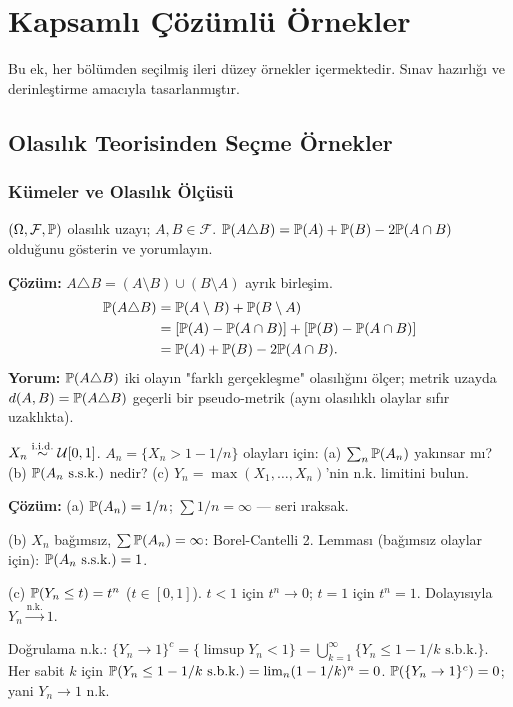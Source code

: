 \chapter{Kapsamlı Çözümlü Örnekler}
\label{app:kapsamli_ornekler}

Bu ek, her bölümden seçilmiş ileri düzey örnekler içermektedir. Sınav hazırlığı ve derinleştirme amacıyla tasarlanmıştır.

\section{Olasılık Teorisinden Seçme Örnekler}
\label{app:olasilik_ornekler}

\subsection{Kümeler ve Olasılık Ölçüsü}

\begin{ornek}
$(\Omega,\mathcal{F},\mathbb{P})$ olasılık uzayı; $A,B\in\mathcal{F}$.
$\mathbb{P}(A\triangle B) = \mathbb{P}(A)+\mathbb{P}(B)-2\mathbb{P}(A\cap B)$ olduğunu gösterin ve yorumlayın.

\textbf{Çözüm:} $A\triangle B = (A\setminus B)\cup(B\setminus A)$ ayrık birleşim.
\begin{align*}
  \mathbb{P}(A\triangle B) &= \mathbb{P}(A\setminus B)+\mathbb{P}(B\setminus A) \\
  &= [\mathbb{P}(A)-\mathbb{P}(A\cap B)]+[\mathbb{P}(B)-\mathbb{P}(A\cap B)] \\
  &= \mathbb{P}(A)+\mathbb{P}(B)-2\mathbb{P}(A\cap B).
\end{align*}
\textbf{Yorum:} $\mathbb{P}(A\triangle B)$ iki olayın "farklı gerçekleşme" olasılığını ölçer; metrik uzayda $d(A,B)=\mathbb{P}(A\triangle B)$ geçerli bir pseudo-metrik (aynı olasılıklı olaylar sıfır uzaklıkta).
\end{ornek}

\begin{ornek}
$X_n\overset{\text{i.i.d.}}{\sim}\mathcal{U}[0,1]$. $A_n=\{X_n>1-1/n\}$ olayları için:
(a) $\sum_n\mathbb{P}(A_n)$ yakınsar mı?
(b) $\mathbb{P}(A_n\text{ s.s.k.})$ nedir?
(c) $Y_n=\max(X_1,\ldots,X_n)$'nin n.k. limitini bulun.

\textbf{Çözüm:}
(a) $\mathbb{P}(A_n)=1/n$; $\sum 1/n=\infty$ --- seri ıraksak.

(b) $X_n$ bağımsız, $\sum\mathbb{P}(A_n)=\infty$: Borel-Cantelli 2. Lemması (bağımsız olaylar için): $\mathbb{P}(A_n\text{ s.s.k.})=1$.

(c) $\mathbb{P}(Y_n\leq t)=t^n$ ($t\in[0,1]$). $t<1$ için $t^n\to0$; $t=1$ için $t^n=1$. Dolayısıyla $Y_n\xrightarrow{\text{n.k.}}1$.

Doğrulama n.k.: $\{Y_n\to1\}^c=\{\limsup Y_n<1\}=\bigcup_{k=1}^\infty\{Y_n\leq1-1/k\text{ s.b.k.}\}$. Her sabit $k$ için $\mathbb{P}(Y_n\leq1-1/k\text{ s.b.k.})=\lim_n(1-1/k)^n=0$. $\mathbb{P}(\{Y_n\to1\}^c)=0$; yani $Y_n\to1$ n.k.
\end{ornek}

